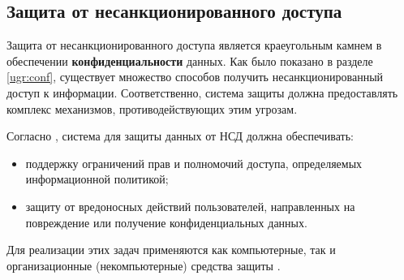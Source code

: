 \subsection{Защита от несанкционированного доступа}
Защита от несанкционированного доступа является краеугольным камнем в обеспечении \textbf{конфиденциальности} данных. Как было показано в разделе \ref{ugr:conf}, существует множество способов получить несанкционированный доступ к информации. Соответственно, система защиты должна предоставлять комплекс механизмов, противодействующих этим угрозам.

Согласно \autocite[с. 11]{Skakun}, система для защиты данных от НСД должна обеспечивать:
\begin{itemize}
	\item поддержку ограничений прав и полномочий доступа, определяемых информационной политикой;
	\item защиту от вредоносных действий пользователей, направленных на повреждение или получение конфиденциальных данных.
\end{itemize}

Для реализации этих задач применяются как компьютерные, так и организационные (некомпьютерные) средства защиты \autocite[сс. 12-14]{Skakun}.

